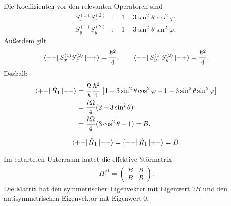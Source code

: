 \documentclass[11pt,a4paper]{scrartcl}
\newcommand{\op}[1]{\hat{#1}}
\begin{document}
\begin{enumerate}[label=(\alph*)]
\begin{calculationbox}
            \begin{calculationbox}[title=Außerdiagonale Matrixelemente]
                Die Koeffizienten vor den relevanten Operatoren sind
                \begin{align*}
                    S_x^{(1)}S_x^{(2)} &: \quad 1-3\sin^2\theta\cos^2\varphi,\\
                    S_y^{(1)}S_y^{(2)} &: \quad 1-3\sin^2\theta\sin^2\varphi.
                \end{align*}
                Außerdem gilt
                \begin{align*}
                    \bra{+-}S_x^{(1)}S_x^{(2)}\ket{-+}
                    =
                    \frac{\hbar^2}{4},
                    \qquad
                    \bra{+-}S_y^{(1)}S_y^{(2)}\ket{-+}
                    =
                    \frac{\hbar^2}{4}.
                \end{align*}
                Deshalb
                \begin{align*}
                    \bra{+-}\op H_1\ket{-+}
                    &=
                    \frac{\Omega}{\hbar}\frac{\hbar^2}{4}
                    \left[
                        1-3\sin^2\theta\cos^2\varphi
                        +1-3\sin^2\theta\sin^2\varphi
                    \right]\\
                    &=
                    \frac{\hbar\Omega}{4}(2-3\sin^2\theta)\\
                    &=
                    \frac{\hbar\Omega}{4}(3\cos^2\theta-1)
                    =B.
                \end{align*}

                \begin{solutionbox}[title=Außerdiagonale Matrixelemente]
                    \begin{align*}
                        \bra{+-}\op H_1\ket{-+}
                        =
                        \bra{-+}\op H_1\ket{+-}
                        =
                        B.
                    \end{align*}
                \end{solutionbox}
            \end{calculationbox}

            \begin{calculationbox}[title=Störmatrix und Diagonalisierung]
                Im entarteten Unterraum lautet die effektive Störmatrix
                \begin{align*}
                    H_1^{\mathrm{eff}}
                    =
                    \begin{pmatrix}
                        B&B\\
                        B&B
                    \end{pmatrix}.
                \end{align*}
                Die Matrix hat den symmetrischen Eigenvektor mit Eigenwert $2B$ und den antisymmetrischen Eigenvektor mit Eigenwert $0$.


\end{calculationbox}
\end{calculationbox}
\end{enumerate}
\end{document}
